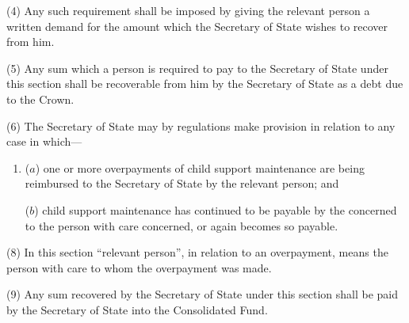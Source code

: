 \documentclass[a4paper]{article}
\begin{document}
(4)
Any such requirement shall be imposed by giving the relevant person a written demand for the amount which the Secretary of State wishes to recover from him.

(5)
Any sum which a person is required to pay to the Secretary of State under this section shall be recoverable from him by the Secretary of State as a debt due to the Crown.

(6)
The Secretary of State may by regulations make provision in relation to any case in which---
\begin{enumerate}\item[]
($a$) one or more overpayments of child support maintenance are being
reimbursed to the Secretary of State by the relevant person; and

($b$) child support maintenance has continued to be payable by the  concerned to the person with care concerned,
or again becomes so payable.
\end{enumerate}



(8)
In this section “relevant person”, in relation to an overpayment, means the person with care to whom the overpayment was made.

(9)
Any sum recovered by the Secretary of State under this section shall be paid by the Secretary of State into the Consolidated Fund.
\end{document}

